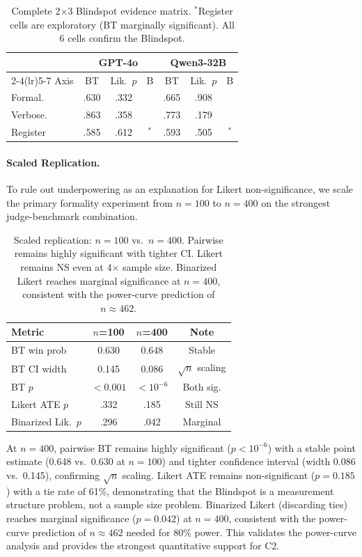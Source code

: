 \documentclass[10pt,twocolumn]{article}
\newcommand{\cmark}{\checkmark}
\begin{document}
\begin{table}[t]
\centering
\caption{Complete 2$\times$3 Blindspot evidence matrix. $^*$Register cells are exploratory (BT marginally significant). All 6 cells confirm the Blindspot.}
\label{tab:blindspot}
\small
\begin{tabular}{@{}lcccccc@{}}
\toprule
& \multicolumn{3}{c}{GPT-4o} & \multicolumn{3}{c}{Qwen3-32B} \\
\cmidrule(lr){2-4}\cmidrule(lr){5-7}
Axis & BT & Lik.\ $p$ & B & BT & Lik.\ $p$ & B \\
\midrule
Formal. & .630 & .332 & \cmark & .665 & .908 & \cmark \\
Verbose. & .863 & .358 & \cmark & .773 & .179 & \cmark \\
Register & .585 & .612 & \cmark$^*$ & .593 & .505 & \cmark$^*$ \\
\bottomrule
\end{tabular}
\end{table}

\paragraph{Scaled Replication.}
To rule out underpowering as an explanation for Likert non-significance, we scale the primary formality experiment from $n=100$ to $n=400$ on the strongest judge-benchmark combination.

\begin{table}[t]
\centering
\caption{Scaled replication: $n=100$ vs.\ $n=400$. Pairwise remains highly significant with tighter CI. Likert remains NS even at 4$\times$ sample size. Binarized Likert reaches marginal significance at $n=400$, consistent with the power-curve prediction of $n\approx462$.}
\label{tab:scaled}
\small
\begin{tabular}{@{}lccc@{}}
\toprule
Metric & $n$=100 & $n$=400 & Note \\
\midrule
BT win prob & 0.630 & 0.648 & Stable \\
BT CI width & 0.145 & 0.086 & $\sqrt{n}$ scaling \\
BT $p$ & ${<}0.001$ & ${<}10^{-6}$ & Both sig. \\
Likert ATE $p$ & .332 & .185 & Still NS \\
Binarized Lik.\ $p$ & .296 & .042 & Marginal \\
\bottomrule
\end{tabular}
\end{table}

At $n=400$, pairwise BT remains highly significant ($p<10^{-6}$) with a stable point estimate (0.648 vs.\ 0.630 at $n=100$) and tighter confidence interval (width 0.086 vs.\ 0.145), confirming $\sqrt{n}$ scaling.
Likert ATE remains non-significant ($p=0.185$) with a tie rate of 61\%, demonstrating that the Blindspot is a measurement structure problem, not a sample size problem.
Binarized Likert (discarding ties) reaches marginal significance ($p=0.042$) at $n=400$, consistent with the power-curve prediction of $n\approx462$ needed for 80\% power.
This validates the power-curve analysis and provides the strongest quantitative support for C2.
\end{document}
